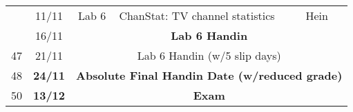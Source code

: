 \begin{table}[h]
\begin{tabular}{ccclcl}
                    & 11/11          & Lab 6            & ChanStat: TV channel statistics        & Hein             &                                 \\
                    & 16/11          & \multicolumn{4}{c}{\textbf{Lab 6 Handin}}                                                                      \\
47                  & 21/11          & \multicolumn{4}{c}{Lab 6 Handin (w/5 slip days)}                                                               \\
48                  & \textbf{24/11} & \multicolumn{4}{c}{\textbf{Absolute Final Handin Date (w/reduced grade)}}                                      \\
50                  & \textbf{13/12} & \multicolumn{4}{c}{\textbf{Exam}}                                                                             
\end{tabular}
\end{table}
